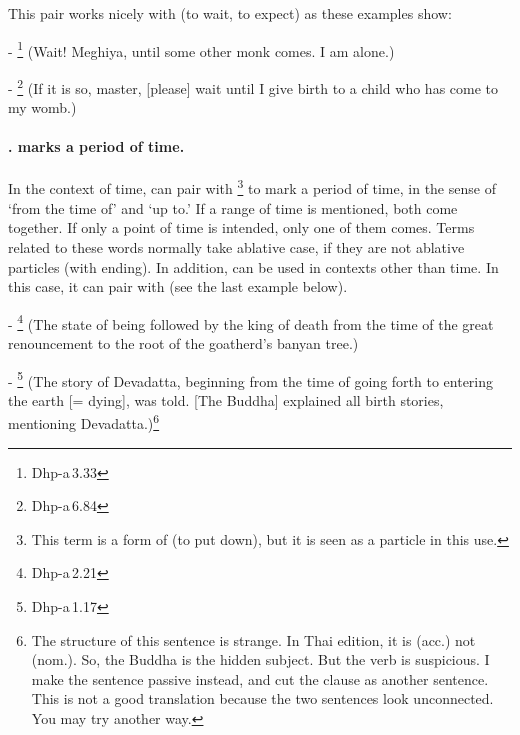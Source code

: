 \medskip
This pair works nicely with  (to wait, to expect) as these examples show:\par
- \footnote{Dhp-a\,3.33} (Wait! Meghiya, until some other monk comes. I am alone.)\par
- \footnote{Dhp-a\,6.84} (If it is so, master, [please] wait until I give birth to a child who has come to my womb.)\par

\paragraph*{.  marks a period of time.} In the context of time,  can pair with \footnote{This term is a  form of  (to put down), but it is seen as a particle in this use.} to mark a period of time, in the sense of `from the time of' and `up to.' If a range of time is mentioned, both come together. If only a point of time is intended, only one of them comes. Terms related to these words normally take ablative case, if they are not ablative particles (with  ending). In addition,  can be used in contexts other than time. In this case, it can pair with  (see the last example below).\par
- \footnote{Dhp-a\,2.21} (The state of being followed by the king of death from the time of the great renouncement to the root of the goatherd's banyan tree.)\par
- \footnote{Dhp-a\,1.17} (The story of Devadatta, beginning from the time of going forth to entering the earth [= dying], was told. [The Buddha] explained all birth stories, mentioning Devadatta.)\footnote{The structure of this sentence is strange. In Thai edition, it is  (acc.) not  (nom.). So, the Buddha is the hidden subject. But the verb  is suspicious. I make the sentence passive instead, and cut the  clause as another sentence. This is not a good translation because the two sentences look unconnected. You may try another way.}\par
